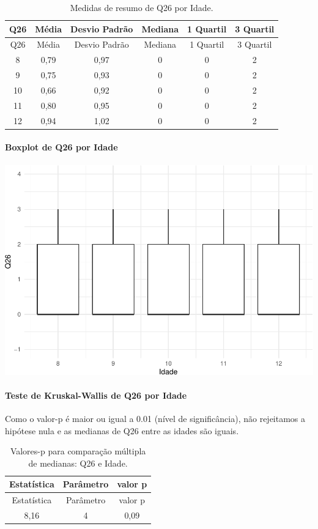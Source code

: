 \documentclass[]{article}
\let\oldparagraph\paragraph
\renewcommand{\paragraph}[1]{\oldparagraph{#1}\mbox{}}
\begin{document}
\begin{longtable}[]{@{}cccccc@{}}
\caption{\label{tab:unnamed-chunk-745}Medidas de resumo de Q26 por Idade.}\tabularnewline
\toprule
Q26 & Média & Desvio Padrão & Mediana & 1 Quartil & 3 Quartil\tabularnewline
\midrule
\endfirsthead
\toprule
Q26 & Média & Desvio Padrão & Mediana & 1 Quartil & 3 Quartil\tabularnewline
\midrule
\endhead
8 & 0,79 & 0,97 & 0 & 0 & 2\tabularnewline
9 & 0,75 & 0,93 & 0 & 0 & 2\tabularnewline
10 & 0,66 & 0,92 & 0 & 0 & 2\tabularnewline
11 & 0,80 & 0,95 & 0 & 0 & 2\tabularnewline
12 & 0,94 & 1,02 & 0 & 0 & 2\tabularnewline
\bottomrule
\end{longtable}

\hypertarget{boxplot-de-q26-por-idade}{%
\paragraph{Boxplot de Q26 por Idade}\label{boxplot-de-q26-por-idade}}

\begin{center}\includegraphics[width=0.75\linewidth]{relatorio_covid19_files/figure-latex/unnamed-chunk-746-1} \end{center}

\hypertarget{teste-de-kruskal-wallis-de-q26-por-idade}{%
\paragraph{Teste de Kruskal-Wallis de Q26 por Idade}\label{teste-de-kruskal-wallis-de-q26-por-idade}}

Como o valor-p é maior ou igual a 0.01 (nível de significância), não rejeitamos a hipótese nula e as medianas de Q26 entre as idades são iguais.

\begin{longtable}[]{@{}ccc@{}}
\caption{\label{tab:unnamed-chunk-748}Valores-p para comparação múltipla de medianas: Q26 e Idade.}\tabularnewline
\toprule
Estatística & Parâmetro & valor p\tabularnewline
\midrule
\endfirsthead
\toprule
Estatística & Parâmetro & valor p\tabularnewline
\midrule
\endhead
8,16 & 4 & 0,09\tabularnewline
\bottomrule
\end{longtable}
\end{document}
